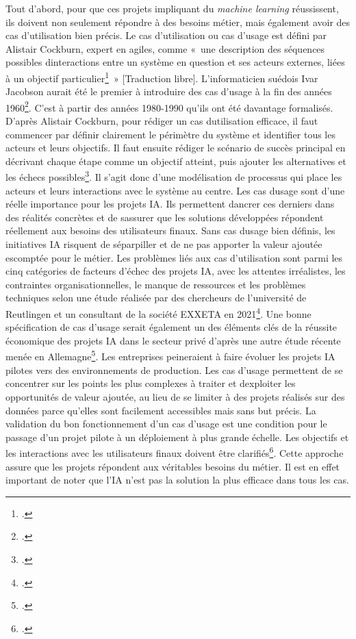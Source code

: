 Tout d'abord, pour que ces projets impliquant du \emph{machine learning}
réussissent, ils doivent non seulement répondre à des besoins métier,
mais également avoir des cas d'utilisation bien précis. Le cas
d'utilisation ou cas d'usage est défini par Alistair Cockburn, expert en
\gls{agiles}, comme «~une description des séquences possibles
d\textquotesingle interactions entre un système en question et ses
acteurs externes, liées à un objectif particulier\footcite{cockburn_writing_2001}~» {[}Traduction libre{]}. L'informaticien suédois Ivar
Jacobson aurait été le premier à introduire des cas d'usage à la fin des
années 1960\footcite{cockburn_writing_2001}. C'est à partir des années
1980-1990 qu'ils ont été davantage formalisés. D'après Alistair
Cockburn, pour rédiger un cas d\textquotesingle utilisation efficace, il
faut commencer par définir clairement le périmètre du système et
identifier tous les acteurs et leurs objectifs. Il faut ensuite rédiger
le scénario de succès principal en décrivant chaque étape comme un
objectif atteint, puis ajouter les alternatives et les échecs possibles\footcite{cockburn_writing_2001}.
Il s'agit donc d'une modélisation de processus qui place les acteurs et
leurs interactions avec le système au centre. Les cas
d\textquotesingle usage sont d'une réelle importance pour les projets
IA. Ils permettent d\textquotesingle ancrer ces derniers dans des
réalités concrètes et de s\textquotesingle assurer que les solutions
développées répondent réellement aux besoins des utilisateurs finaux.
Sans cas d\textquotesingle usage bien définis, les initiatives IA
risquent de s\textquotesingle éparpiller et de ne pas apporter la valeur
ajoutée escomptée pour le métier. Les problèmes liés aux cas
d'utilisation sont parmi les cinq catégories de facteurs d'échec des
projets IA, avec les attentes irréalistes, les contraintes
organisationnelles, le manque de ressources et les problèmes techniques selon une étude réalisée par des chercheurs de
l'université de Reutlingen et un consultant de la société EXXETA en
2021\footcite{westenberger_failure_2022}. Une bonne spécification
de cas d'usage serait également un des éléments clés de la réussite
économique des projets IA dans le secteur privé d'après une autre étude
récente menée en Allemagne\footcite{grebe_artificial_2023}.
Les entreprises peineraient à faire évoluer les projets IA pilotes vers
des environnements de production. Les cas d'usage permettent de se
concentrer sur les points les plus complexes à traiter et
d\textquotesingle exploiter les opportunités de valeur ajoutée, au lieu
de se limiter à des projets réalisés sur des données parce qu'elles sont
facilement accessibles mais sans but précis. La validation du bon
fonctionnement d'un cas d'usage est une condition
pour le passage d'un projet pilote à un déploiement à plus grande échelle.
Les objectifs et les interactions avec les utilisateurs finaux doivent être clarifiés\footcite{grebe_artificial_2023}. Cette approche assure que les projets
répondent aux véritables besoins du métier. Il est en effet important de
noter que l'IA n'est pas la solution la plus efficace dans tous
les cas.\newline 


